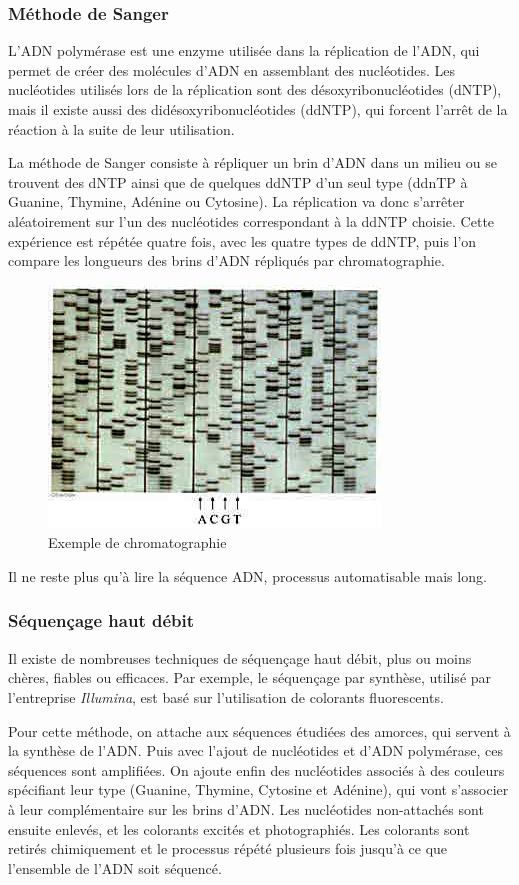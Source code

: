 \subsubsection{Méthode de Sanger}
L'ADN polymérase est une enzyme utilisée dans la réplication de l'ADN, qui permet de créer des molécules d'ADN en assemblant des nucléotides. Les nucléotides utilisés lors de la réplication sont des désoxyribonucléotides (dNTP), mais il existe aussi des didésoxyribonucléotides (ddNTP), qui forcent l’arrêt de la réaction à la suite de leur utilisation. 

La méthode de Sanger consiste à répliquer un brin d'ADN dans un milieu ou se trouvent des dNTP ainsi que de quelques ddNTP d'un seul type (ddnTP à Guanine, Thymine, Adénine ou Cytosine). La réplication va donc s’arrêter aléatoirement sur l'un des nucléotides correspondant à la ddNTP choisie. Cette expérience est répétée quatre fois, avec les quatre types de ddNTP, puis l'on compare les longueurs des brins d'ADN répliqués par chromatographie.


\begin{figure}[!ht]
    \center
    \includegraphics[]{./images/chromato_acanthoweb.jpg}
    \caption{Exemple de chromatographie}
    \label{chromato}
\end{figure}


Il ne reste plus qu'à lire la séquence ADN, processus automatisable mais long.

\subsubsection{Séquençage haut débit}
Il existe de nombreuses techniques de séquençage haut débit, plus ou moins chères, fiables ou efficaces.
Par exemple, le séquençage par synthèse, utilisé par l'entreprise \emph{Illumina}, est basé sur l'utilisation de colorants fluorescents.

Pour cette méthode, on attache aux séquences étudiées des amorces, qui servent à la synthèse de l'ADN. Puis avec l'ajout de nucléotides et d'ADN polymérase, ces séquences sont amplifiées. On ajoute enfin des nucléotides associés à des couleurs spécifiant leur type (Guanine, Thymine, Cytosine et Adénine), qui vont s'associer à leur complémentaire sur les brins d'ADN. Les nucléotides non-attachés sont ensuite enlevés, et les colorants excités et photographiés. Les colorants sont retirés chimiquement et le processus répété plusieurs fois jusqu'à ce que l'ensemble de l'ADN soit séquencé.

